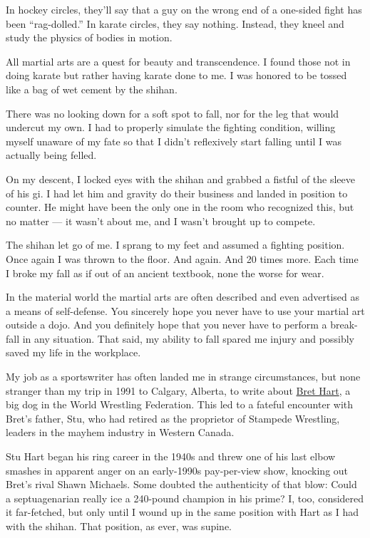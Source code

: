 In hockey circles, they'll say that a guy on the wrong end of a
one-sided fight has been ``rag-dolled.'' In karate circles, they say
nothing. Instead, they kneel and study the physics of bodies in motion.

All martial arts are a quest for beauty and transcendence. I found those
not in doing karate but rather having karate done to me. I was honored
to be tossed like a bag of wet cement by the shihan.

There was no looking down for a soft spot to fall, nor for the leg that
would undercut my own. I had to properly simulate the fighting
condition, willing myself unaware of my fate so that I didn't
reflexively start falling until I was actually being felled.

On my descent, I locked eyes with the shihan and grabbed a fistful of
the sleeve of his gi. I had let him and gravity do their business and
landed in position to counter. He might have been the only one in the
room who recognized this, but no matter --- it wasn't about me, and I
wasn't brought up to compete.

The shihan let go of me. I sprang to my feet and assumed a fighting
position. Once again I was thrown to the floor. And again. And 20 times
more. Each time I broke my fall as if out of an ancient textbook, none
the worse for wear.

In the material world the martial arts are often described and even
advertised as a means of self-defense. You sincerely hope you never have
to use your martial art outside a dojo. And you definitely hope that you
never have to perform a break-fall in any situation. That said, my
ability to fall spared me injury and possibly saved my life in the
workplace.

My job as a sportswriter has often landed me in strange circumstances,
but none stranger than my trip in 1991 to Calgary, Alberta, to write
about \href{https://www.brethart.com/}{Bret Hart}, a big dog in the
World Wrestling Federation. This led to a fateful encounter with Bret's
father, Stu, who had retired as the proprietor of Stampede Wrestling,
leaders in the mayhem industry in Western Canada.

Stu Hart began his ring career in the 1940s and threw one of his last
elbow smashes in apparent anger on an early-1990s pay-per-view show,
knocking out Bret's rival Shawn Michaels. Some doubted the authenticity
of that blow: Could a septuagenarian really ice a 240-pound champion in
his prime? I, too, considered it far-fetched, but only until I wound up
in the same position with Hart as I had with the shihan. That position,
as ever, was supine.

